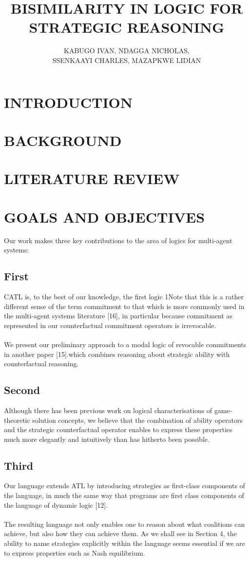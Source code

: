 \documentclass[10pt,a4paper]{article}
\begin{document}
\author{KABUGO IVAN, NDAGGA NICHOLAS,\\ SSENKAAYI CHARLES, MAZAPKWE LIDIAN}
\title{\textbf{BISIMILARITY IN LOGIC FOR STRATEGIC REASONING}}
\maketitle
\section{INTRODUCTION}

\section{BACKGROUND}	


\section{ LITERATURE REVIEW }
\section{GOALS AND OBJECTIVES}	
Our work makes three key contributions to the area of logics for multi-agent systems:
\subsection{First}
CATL is, to the best of our knowledge, the first logic 1Note that this is a rather different sense of the term commitment to that which is more commonly used in the multi-agent systems literature [16], in particular because commitment as represented in our counterfactual commitment operators is irrevocable.\\\\ We present our preliminary approach to a modal logic of revocable commitments
in another paper [15].which combines reasoning about strategic ability with counterfactual
reasoning.

\subsection{Second}
Although there has been previous work on logical characterisations of game-theoretic solution concepts, we believe that the combination of ability operators and the strategic counterfactual operator enables to express these properties much more elegantly and intuitively than has hitherto been possible.

\subsection{Third}
Our language extends ATL by introducing strategies as first-class components of the language, in much the same way that programs are first class components of the language of dynamic logic [12].\\\\ The resulting language not only enables one to reason about what coalitions can achieve, but also how they can achieve them. As we shall see in Section 4, the ability to name strategies explicitly within the language seems essential if we are to express properties such as Nash equilibrium.
\end{document}

